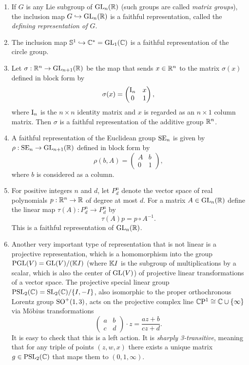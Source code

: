\begin{example}\label{ex Lie group representations}
    \begin{enumerate}[label=(\alph*)]
        \item If $G$ is any Lie subgroup of $\operatorname{GL}_n(\mathbb{R})$ (such groups are called \emph{matrix groups}), the inclusion map $G\hookrightarrow \operatorname{GL}_n(\mathbb{R})$ is a faithful representation, called the \emph{defining representation of $G$}.
        \item The inclusion map $\mathbb{S}^1\hookrightarrow\mathbb{C}^\ast=\operatorname{GL}_1(\mathbb{C})$ is a faithful representation of the circle group.
        \item Let $\sigma:\mathbb{R}^n\to \operatorname{GL}_{n+1}(\mathbb{R})$ be the map that sends $x\in\mathbb{R}^n$ to the matrix $\sigma(x)$ defined in block form by 
        \[\sigma(x)=\begin{pmatrix}
            \mathrm{I}_n & x\\
            0 & 1
        \end{pmatrix},\]
        where $\mathrm{I}_n$ is the $n\times n$ identity matrix and $x$ is regarded as an $n\times 1$  column matrix. Then $\sigma$ is a faithful representation of the additive group $\mathbb{R}^n$.
        \item A faithful representation of the Euclidean group $\operatorname{SE}_n$ is given by $\rho:\operatorname{SE}_n\to \operatorname{GL}_{n+1}(\mathbb{R})$ defined in block form by
        \[\rho(b,A)=\begin{pmatrix}
            A & b\\
            0 & 1
        \end{pmatrix},
        \]
        where $b$ is considered as a column.
        \item For positive integers $n$ and $d$, let $P^n_d$ denote the vector space of real polynomials $p:\mathbb{R}^n\to \mathbb{R}$ of degree at most $d$. For a matrix $A\in\operatorname{GL}_n(\mathbb{R})$ define the linear map $\tau(A):P^n_d\to P^n_d$ by
        \[\tau(A)p=p\circ A^{-1}.\]
        This is a faithful representation of $\operatorname{GL}_n(\mathbb{R})$.

        \item Another very important type of representation that is not linear is a projective representation, which is a homomorphism into the group $\operatorname{PGL}(V)=\operatorname{GL}(V)\slash (\mathbb{K} I)$ (where $\mathbb{K} I$ is the subgroup of multiplications by a scalar, which is also the center of $\operatorname{GL}(V)$) of projective linear transformations of a vector space. The projective special linear group $\operatorname{PSL}_2(\mathbb{C})=\operatorname{SL}_2(\mathbb{C})\slash\{I,-I\}$, also isomorphic to the proper orthochronous Lorentz group $\operatorname{SO}^+(1,3)$, acts on the projective complex line $\mathbb{C}\mathrm{P}^1\cong \mathbb{C}\cup\{\infty\}$ via M\"obius transformations
        \[\begin{pmatrix}
            a & b\\
            c& d
        \end{pmatrix} \cdot z=\frac{az+b}{cz+d}.\]
        It is easy to check that this is a left action. It is \emph{sharply 3-transitive}, meaning that for any triple of points $(z,w,x)$ there exists a unique matrix $g\in \operatorname{PSL}_2(\mathbb{C})$ that maps them to $(0,1,\infty)$.
    \end{enumerate}
\end{example}

